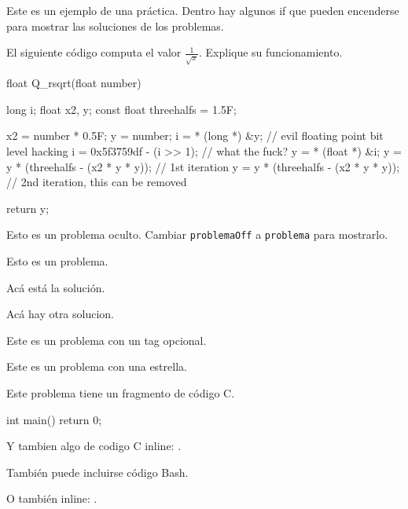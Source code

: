 \documentclass[practica]{lcc}
\begin{document}
\maketitle

Este es un ejemplo de una práctica. Dentro hay algunos if que pueden
encenderse para mostrar las soluciones de los problemas.

\begin{problema}
    El siguiente código computa el valor $\frac{1}{\sqrt{x}}$. Explique
    su funcionamiento.
    \begin{C}
float Q_rsqrt(float number)
{
    long i;
    float x2, y;
    const float threehalfs = 1.5F;

    x2 = number * 0.5F;
    y  = number;
    i  = * (long *) &y;                   // evil floating point bit level hacking
    i  = 0x5f3759df - (i >> 1);           // what the fuck?
    y  = * (float *) &i;
    y  = y * (threehalfs - (x2 * y * y)); // 1st iteration
    y  = y * (threehalfs - (x2 * y * y)); // 2nd iteration, this can be removed

    return y;
}
    \end{C}
\end{problema}

\begin{problemaOff}
    Esto es un problema oculto. Cambiar \texttt{problemaOff} a
    \texttt{problema} para mostrarlo.
\end{problemaOff}

\begin{problema}
    Esto es un problema.
    \begin{solucion}
        Acá está la solución.
    \end{solucion}
    \begin{solucion}[variante 2]
        Acá hay otra solucion.
    \end{solucion}
\end{problema}

\begin{problema}[(difícil)]
    Este es un problema con un tag opcional.
\end{problema}

\begin{problema}[\unskip*]
    Este es un problema con una estrella.
\end{problema}

\begin{problema}
    Este problema tiene un fragmento de código C.
    \begin{C}
int main()
{
    return 0;
}
    \end{C}
    Y tambien algo de codigo C inline: .
\end{problema}

\begin{problema}
    También puede incluirse código Bash.
    O también inline: \bash{:()\{ :|:& \};:}.
\end{problema}
\end{document}

